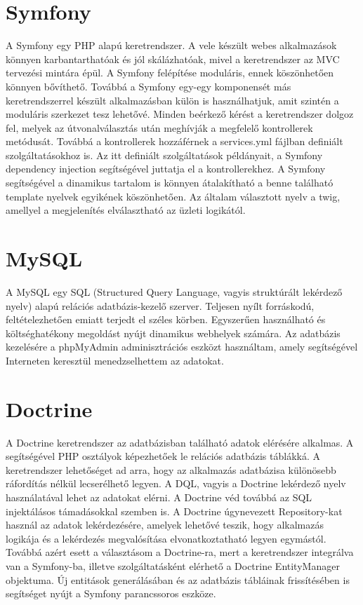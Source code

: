 \section*{Symfony}
A Symfony egy PHP alapú keretrendszer.
A vele készült webes alkalmazások könnyen karbantarthatóak és jól skálázhatóak, mivel a keretrendszer az MVC tervezési mintára épül.
A Symfony felépítése moduláris, ennek köszönhetően könnyen bővíthető.
Továbbá a Symfony egy-egy komponensét más keretrendszerrel készült alkalmazásban külön is használhatjuk, amit szintén a moduláris szerkezet tesz lehetővé.
Minden beérkező kérést a keretrendszer dolgoz fel, melyek az útvonalválasztás után meghívják a megfelelő kontrollerek metódusát.
Továbbá a kontrollerek hozzáférnek a services.yml fájlban definiált szolgáltatásokhoz is.
Az itt definiált szolgáltatások példányait, a Symfony dependency injection segítségével juttatja el a kontrollerekhez.
A Symfony segítségével a dinamikus tartalom is könnyen átalakítható a benne található template nyelvek egyikének köszönhetően.
Az általam választott nyelv a twig, amellyel a megjelenítés elválasztható az üzleti logikától. 

\section*{MySQL}
A MySQL  egy SQL (Structured Query Language, vagyis struktúrált lekérdező nyelv) alapú relációs adatbázis-kezelő szerver.
Teljesen nyílt forráskodú, feltételezhetően emiatt terjedt el széles körben.
Egyszerűen használható és költséghatékony megoldást nyújt dinamikus webhelyek számára.
Az adatbázis kezelésére a phpMyAdmin adminisztrációs eszközt használtam, amely segítségével Interneten keresztül menedzselhettem az adatokat.

\section*{Doctrine}
A Doctrine keretrendszer az adatbázisban található adatok elérésére alkalmas.
A segítségével PHP osztályok képezhetőek le relációs adatbázis táblákká.
A keretrendszer lehetőséget ad arra, hogy az alkalmazás adatbázisa különösebb ráfordítás nélkül lecserélhető legyen.
A DQL, vagyis a Doctrine lekérdező nyelv használatával lehet az adatokat elérni.
A Doctrine véd továbbá az SQL injektálásos támadásokkal szemben is.
A Doctrine úgynevezett Repository-kat használ az adatok lekérdezésére, amelyek lehetővé teszik, hogy alkalmazás logikája és a lekérdezés megvalósítása elvonatkoztatható legyen egymástól.
Továbbá azért esett a választásom a Doctrine-ra, mert a keretrendszer integrálva van a Symfony-ba, illetve szolgáltatásként elérhető a Doctrine EntityManager objektuma.
Új entitások generálásában és az adatbázis tábláinak frissítésében is segítséget nyújt a Symfony parancssoros eszköze.













